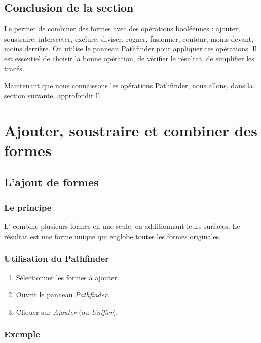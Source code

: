 \subsection*{Conclusion de la section}

Le  permet de combiner des formes avec des opérations booléennes : ajouter, soustraire, intersecter, exclure, diviser, rogner, fusionner, contour, moins devant, moins derrière. On utilise le panneau Pathfinder pour appliquer ces opérations. Il est essentiel de choisir la bonne opération, de vérifier le résultat, de simplifier les tracés.

Maintenant que nous connaissons les opérations Pathfinder, nous allons, dans la section suivante, approfondir l'.

\section{Ajouter, soustraire et combiner des formes}

\subsection{L'ajout de formes}

\subsubsection{Le principe}

L' combine plusieurs formes en une seule, en additionnant leurs surfaces. Le résultat est une forme unique qui englobe toutes les formes originales.

\subsubsection{Utilisation du Pathfinder}

\begin{enumerate}
    \item Sélectionner les formes à ajouter.
    \item Ouvrir le panneau \emph{Pathfinder}.
    \item Cliquer sur \emph{Ajouter} (ou \emph{Unifier}).
\end{enumerate}

\subsubsection{Exemple}

